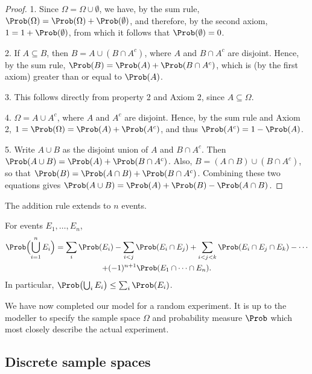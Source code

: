 \begin{proof}
1. Since $\Omega = \Omega \cup \emptyset$, we have, by the sum rule, $\Prob(\Omega) = \Prob(\Omega) + \Prob(\emptyset)$, and therefore, by the second axiom, $1 = 1 + \Prob(\emptyset)$, from which it follows that $\Prob(\emptyset) = 0$.

2. If $A \subseteq B$, then $B = A \cup (B \cap A^c)$, where $A$ and $B \cap A^c$ are disjoint. Hence, by the sum rule, $\Prob(B) = \Prob(A) + \Prob(B \cap A^c)$, which is (by the first axiom) greater than or equal to $\Prob(A)$.

3. This follows directly from property 2 and Axiom 2, since $A \subseteq \Omega$.

4. $\Omega = A \cup A^c$, where $A$ and $A^c$ are disjoint. Hence, by the sum rule and Axiom 2, $1 = \Prob(\Omega) = \Prob(A) + \Prob(A^c)$, and thus $\Prob(A^c) = 1 - \Prob(A)$.

5. Write $A \cup B$ as the disjoint union of $A$ and $B \cap A^c$. Then $\Prob(A \cup B) = \Prob(A) + \Prob(B \cap A^c)$. Also, $B = (A \cap B) \cup (B \cap A^c)$, so that $\Prob(B) = \Prob(A \cap B) + \Prob(B \cap A^c)$. Combining these two equations gives $\Prob(A \cup B) = \Prob(A) + \Prob(B) - \Prob(A \cap B)$.
\end{proof}

The addition rule extends to $n$ events.

\begin{theorem}\label{thm:inclusion-exclusion}
For events $E_1, \ldots, E_n$,
\begin{multline*}
  \Prob\Bigl(\bigcup_{i=1}^n E_i\Bigr) = \sum_i \Prob(E_i) - \sum_{i<j} \Prob(E_i \cap E_j) + \sum_{i<j<k} \Prob(E_i \cap E_j \cap E_k) - \cdots \\
  + (-1)^{n+1} \Prob(E_1 \cap \cdots \cap E_n).
\end{multline*}
In particular, $\Prob\bigl(\bigcup_i E_i\bigr) \le \sum_i \Prob(E_i)$.
\end{theorem}

We have now completed our model for a random experiment. It is up to the modeller to specify the sample space $\Omega$ and probability measure $\Prob$ which most closely describe the actual experiment.

\subsection{Discrete sample spaces}\label{sec:discrete-sample-spaces}

